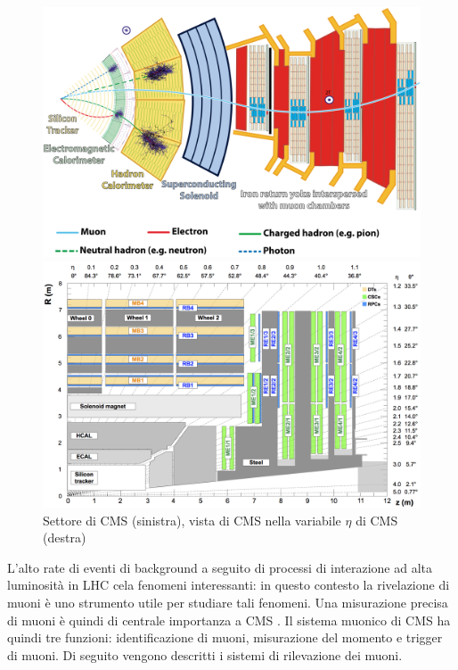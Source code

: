 \begin{figure}[t]
  \centering
  \begin{minipage}[b]{0.48\textwidth}
      \centering
      \includegraphics[width=\textwidth]{../ImmaginiTesi/CMS slice.png} 
  \end{minipage}
  \hfill 
  \begin{minipage}[b]{0.48\textwidth}
      \centering
      \includegraphics[width=\textwidth]{../ImmaginiTesi/CMSEtaView.png} 
  \end{minipage}
  \caption{Settore di CMS (sinistra), vista di CMS  nella variabile $\eta$ di CMS (destra)}
  \label{fig:SectorEtaView}
\end{figure}

L'alto rate di eventi di background a seguito di processi di interazione ad alta luminosità in LHC cela fenomeni interessanti: in questo contesto la rivelazione di muoni è uno strumento utile per studiare tali fenomeni. Una misurazione precisa di muoni è quindi di centrale importanza a CMS \cite{cms2008cms}. Il sistema muonico di CMS ha quindi tre funzioni: identificazione di muoni, misurazione del momento e trigger di muoni. Di seguito vengono descritti i sistemi di rilevazione dei muoni.

